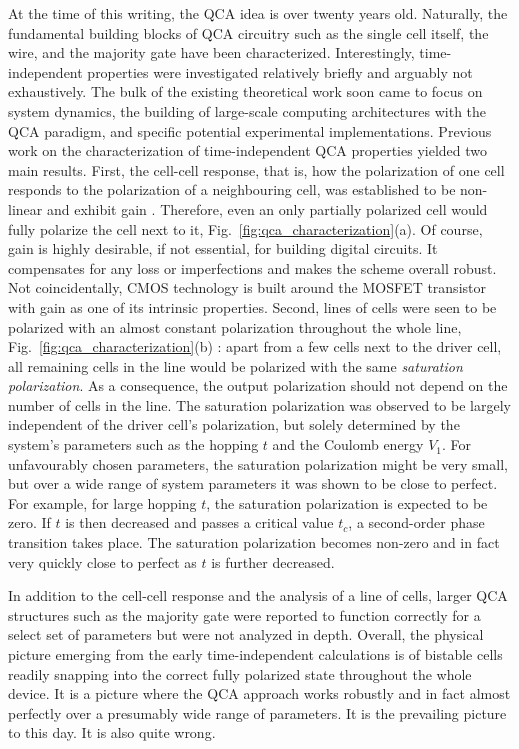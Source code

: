 At the time of this writing, the QCA idea is over twenty years old. Naturally,
the fundamental building blocks of QCA circuitry such as the single cell itself,
the wire, and the majority gate have been characterized. Interestingly,
time-independent properties were investigated relatively briefly and arguably
not exhaustively. The bulk of the existing theoretical work soon came to focus
on system dynamics, the building of large-scale computing architectures with the
QCA paradigm, and specific potential experimental implementations. Previous work
on the characterization of time-independent QCA properties yielded two main
results. First, the cell-cell response, that is, how the polarization of one
cell responds to the polarization of a neighbouring cell, was established to be
non-linear and exhibit gain \cite{lent1993quantum}. Therefore, even an only
partially polarized cell would fully polarize the cell next to it,
Fig.~\ref{fig:qca_characterization}(a). Of course, gain is highly desirable,
if not essential, for building digital circuits. It compensates for any loss or
imperfections and makes the scheme overall robust. Not coincidentally, CMOS
technology is built around the MOSFET transistor with gain as one of its
intrinsic properties. Second, lines of cells were seen to be polarized with an
almost constant polarization throughout the whole line,
Fig.~\ref{fig:qca_characterization}(b) \cite{lent1993lines}: apart from a few
cells next to the driver cell, all remaining cells in the line would be
polarized with the same \emph{saturation polarization}. As a consequence, the
output polarization should not depend on the number of cells in the line. The
saturation polarization was observed to be largely independent of the driver
cell's polarization, but solely determined by the system's parameters such as
the hopping $t$ and the Coulomb energy $V_1$. For unfavourably chosen
parameters, the saturation polarization might be very small, but over a wide
range of system parameters it was shown to be close to perfect. For example, for
large hopping $t$, the saturation polarization is expected to be zero. If $t$ is
then decreased and passes a critical value $t_c$, a second-order phase
transition takes place. The saturation polarization becomes non-zero and in
fact very quickly close to perfect as $t$ is further decreased. 

%
In addition to
the cell-cell response and the analysis of a line of cells, larger QCA
structures such as the majority gate were reported to function correctly for a
select set of parameters but were not analyzed in depth. Overall, the physical
picture emerging from the early time-independent calculations is of bistable
cells readily snapping into the correct fully polarized state throughout the
whole device. It is a picture where the QCA approach works robustly and in fact
almost perfectly over a presumably wide range of parameters. It is the
prevailing picture to this day. It is also quite wrong.

